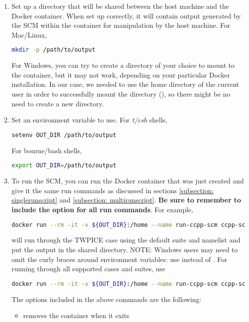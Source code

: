 \begin{enumerate}
\item Set up a directory that will be shared between the host machine and the Docker container. When set up correctly, it will contain output generated by the SCM within the container for manipulation by the host machine. For Mac/Linux,
\begin{lstlisting}[language=bash]
mkdir -p /path/to/output
\end{lstlisting}
For Windows, you can try to create a directory of your choice to mount to the container, but it may not work, depending on your particular Docker installation. In our case, we needed to use the home directory of the current user in order to successfully mount the directory (), so there might be no need to create a new directory.
\item Set an environment variable to use. For \textit{t/csh} shells,
\begin{lstlisting}[language=bash]
setenv OUT_DIR /path/to/output
\end{lstlisting}
For bourne/bash shells,
\begin{lstlisting}[language=bash]
export OUT_DIR=/path/to/output
\end{lstlisting}
\item To run the SCM, you can run the Docker container that was just created and give it the same run commands as discussed in sections \ref{subsection: singlerunscript} and \ref{subsection: multirunscript}. \textbf{Be sure to remember to include the  option for all run commands}. For example,
\begin{lstlisting}[language=bash]
docker run --rm -it -v ${OUT_DIR}:/home --name run-ccpp-scm ccpp-scm ./run_gmtb_scm.py -c twpice -d
\end{lstlisting}
will run through the TWPICE case using the default suite and namelist and put the output in the shared directory. NOTE: Windows users may need to omit the curly braces around environment variables: use  instead of . For running through all supported cases and suites, use
\begin{lstlisting}[language=bash]
docker run --rm -it -v ${OUT_DIR}:/home --name run-ccpp-scm ccpp-scm ./multi_run_gmtb_scm.py -d
\end{lstlisting}
The options included in the above  commands are the following:
\begin{itemize}
\item {} removes the container when it exits

\end{itemize}
\end{enumerate}

